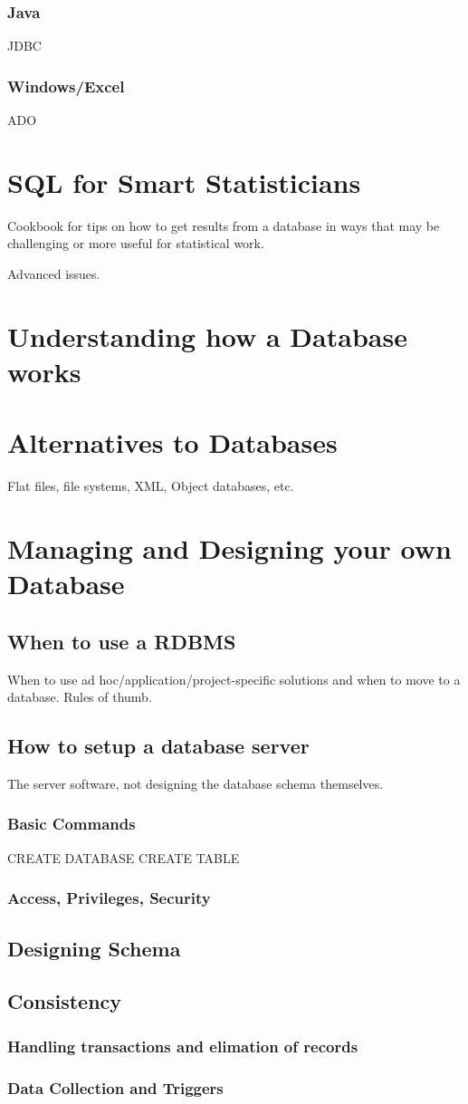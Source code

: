 \documentclass[11pt,timesroman]{article}
\begin{document}
\subsubsection{Java}
JDBC
\subsubsection{Windows/Excel}
ADO


\section{SQL for Smart Statisticians}
Cookbook for tips on how to get results from a database
in ways that may be challenging or more useful for statistical
work.

Advanced issues.


\section{Understanding how a Database works}

\section{Alternatives to Databases}
Flat files, file systems, XML, Object databases, etc.

\section{Managing and Designing your own Database}
\subsection{When to use a RDBMS}
 When to use ad hoc/application/project-specific solutions and
when to move to a database.  Rules of thumb.

\subsection{How to setup a database server}
The server software, not designing the database schema themselves.

\subsubsection{Basic Commands}
CREATE DATABASE
CREATE TABLE
\subsubsection{Access, Privileges, Security}

\subsection{Designing Schema}

\subsection{Consistency}
\subsubsection{Handling transactions and elimation of records}

\subsubsection{Data Collection and Triggers}
\end{document}
